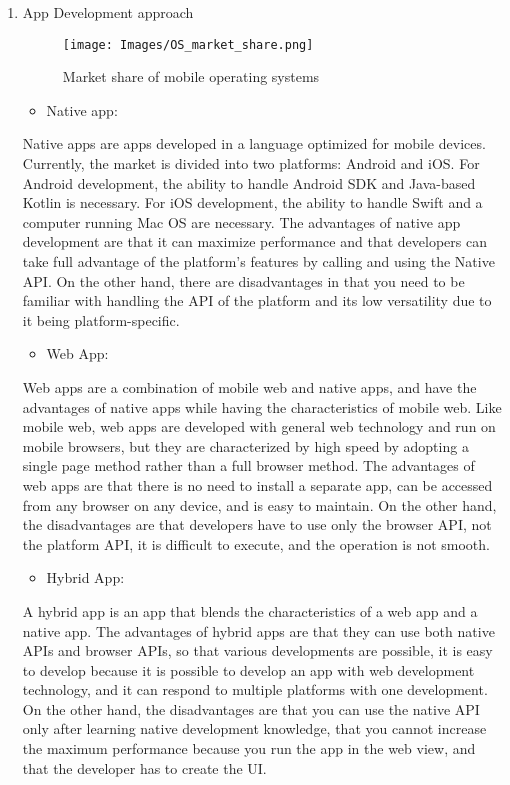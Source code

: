 \documentclass[conference]{IEEEtran}
\begin{document}
\begin{enumerate}
\item App Development approach

\begin{figure}[htp]
    \centering
    \texttt{[image: Images/OS\_market\_share.png]}
    \caption{Market share of mobile operating systems}
\end{figure}

\begin{itemize}
\item Native app: 
\end{itemize}

Native apps are apps developed in a language optimized for mobile devices. Currently, the market is divided into two platforms: Android and iOS. For Android development, the ability to handle Android SDK and Java-based Kotlin is necessary. For iOS development, the ability to handle Swift and a computer running Mac OS are necessary. The advantages of native app development are that it can maximize performance and that developers can take full advantage of the platform's features by calling and using the Native API. On the other hand, there are disadvantages in that you need to be familiar with handling the API of the platform and its low versatility due to it being platform-specific.

\begin{itemize}
\item  Web App:
\end{itemize}

Web apps are a combination of mobile web and native apps, and have the advantages of native apps while having the characteristics of mobile web. Like mobile web, web apps are developed with general web technology and run on mobile browsers, but they are characterized by high speed by adopting a single page method rather than a full browser method. The advantages of web apps are that there is no need to install a separate app, can be accessed from any browser on any device, and is easy to maintain. On the other hand, the disadvantages are that developers have to use only the browser API, not the platform API, it is difficult to execute, and the operation is not smooth.

\begin{itemize}
\item  Hybrid App:
\end{itemize}

A hybrid app is an app that blends the characteristics of a web app and a native app. The advantages of hybrid apps are that they can use both native APIs and browser APIs, so that various developments are possible, it is easy to develop because it is possible to develop an app with web development technology, and it can respond to multiple platforms with one development. On the other hand, the disadvantages are that you can use the native API only after learning native development knowledge, that you cannot increase the maximum performance because you run the app in the web view, and that the developer has to create the UI.\\


\end{enumerate}
\end{document}
